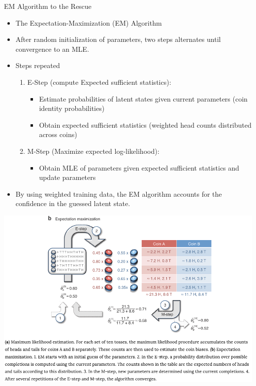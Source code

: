 \documentclass[dvipdfmx,bigger,aspectratio=169]{beamer}
\begin{document}
\begin{frame}[label={sec:org20a0ea6}]{EM Algorithm to the Rescue}
\begin{itemize}
\item The Expectation-Maximization (EM) Algorithm \cite{dempsterMaximumLikelihoodIncomplete1977}
\item After random initialization of parameters, two steps alternates until convergence to an MLE.
\item Steps repeated
\begin{enumerate}
\item E-Step (compute Expected sufficient statistics):
\begin{itemize}
\item Estimate probabilities of latent states given current parameters (coin identity probabilities)
\item Obtain expected sufficient statistics (weighted head counts distributed across coins)
\end{itemize}
\item M-Step (Maximize expected log-likelihood):
\begin{itemize}
\item Obtain MLE of parameters given expected sufficient statistics and update parameters
\end{itemize}
\end{enumerate}
\item By using weighted training data, the EM algorithm accounts for the confidence in the guessed latent state.
\end{itemize}
\end{frame}

\begin{frame}[label={sec:org9d2c3a5}]{}
\begin{center}
\includegraphics[page=1,keepaspectratio,width=\textwidth,height=\textheight]{./source/em_figure.png}
\end{center}
\end{frame}
\end{document}
